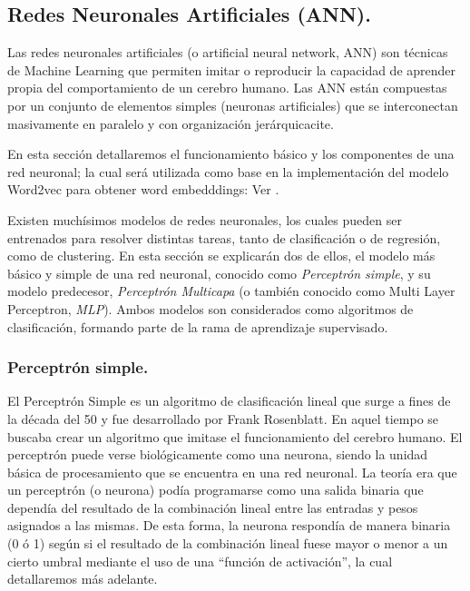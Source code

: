 \documentclass[12pt,a4paper]{article}
\begin{document}
\begin{sloppypar}
\cleardoublepage
\subsection{Redes Neuronales Artificiales (ANN).}

Las redes neuronales artificiales (o artificial neural network, ANN) son técnicas de Machine Learning que permiten imitar o reproducir la capacidad de aprender propia del comportamiento de un cerebro humano. Las ANN están compuestas por un conjunto de elementos simples (neuronas artificiales) que se interconectan masivamente en paralelo y con organización jerárquicacite\cite{ANN_21}.

En esta sección detallaremos el funcionamiento básico y los componentes de una red neuronal; la cual será utilizada como base en la implementación del modelo Word2vec para obtener word embedddings: Ver \textit{}.

Existen muchísimos modelos de redes neuronales, los cuales pueden ser entrenados para resolver distintas tareas, tanto de clasificación o de regresión, como de clustering. En esta sección se explicarán dos de ellos, el modelo más básico y simple de una red neuronal, conocido como \textit{Perceptrón simple}, y su modelo predecesor, \textit{Perceptrón Multicapa} (o también conocido como Multi Layer Perceptron, \textit{MLP}). Ambos modelos son considerados como algoritmos de clasificación, formando parte de la rama de aprendizaje supervisado.

\subsubsection{Perceptrón simple.}

El Perceptrón Simple es un algoritmo de clasificación lineal que surge a fines de la década del 50 y fue desarrollado por Frank Rosenblatt. En aquel tiempo se buscaba crear un algoritmo que imitase el funcionamiento del cerebro humano. El perceptrón puede verse biológicamente como una neurona, siendo la unidad básica de procesamiento que se encuentra en una red neuronal. La teoría era que un perceptrón (o neurona) podía programarse como una salida binaria que dependía del resultado de la combinación lineal entre las entradas y pesos asignados a las mismas. De esta forma, la neurona respondía de manera binaria (0 ó 1) según si el resultado de la combinación lineal fuese mayor o menor a un cierto umbral mediante el uso de una “función de activación”\cite{apunte_uba}, la cual detallaremos más adelante.


\end{sloppypar}
\end{document}
